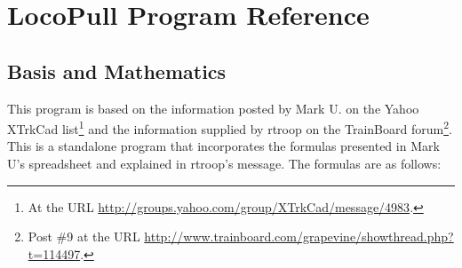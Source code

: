
\chapter{LocoPull Program Reference}
\label{chpt:locopull:Reference}

\section{Basis and Mathematics}
This program is based on the information posted by Mark U. on the Yahoo
XTrkCad list\footnote{At the URL
\url{http://groups.yahoo.com/group/XTrkCad/message/4983}.} and the
information supplied by rtroop on the TrainBoard forum\footnote{Post
\#9 at the URL
\url{http://www.trainboard.com/grapevine/showthread.php?t=114497}.}.
This is a standalone program that incorporates the formulas presented in
Mark U's spreadsheet and explained in rtroop's message.  The formulas
are as follows:

